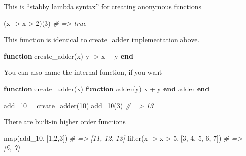 \documentclass[ignorenonframetext,]{beamer}
\newenvironment{Shaded}{}{}
\newcommand{\KeywordTok}[1]{\textcolor[rgb]{0.00,0.44,0.13}{\textbf{{#1}}}}
\newcommand{\FloatTok}[1]{\textcolor[rgb]{0.25,0.63,0.44}{{#1}}}
\newcommand{\CommentTok}[1]{\textcolor[rgb]{0.38,0.63,0.69}{\textit{{#1}}}}
\newcommand{\NormalTok}[1]{{#1}}
\begin{document}
\begin{frame}[fragile]{This is ``stabby lambda syntax'' for creating
anonymous functions}

\begin{Shaded}
\begin{Highlighting}[]
\NormalTok{(x -> x > }\FloatTok{2}\NormalTok{)(}\FloatTok{3}\NormalTok{) }\CommentTok{# => true}
\end{Highlighting}
\end{Shaded}

\end{frame}

\begin{frame}[fragile]{This function is identical to create\_adder
implementation above.}

\begin{Shaded}
\begin{Highlighting}[]
\KeywordTok{function} \NormalTok{create_adder(x)}
    \NormalTok{y -> x + y}
\KeywordTok{end}
\end{Highlighting}
\end{Shaded}

\end{frame}

\begin{frame}[fragile]{You can also name the internal function, if you
want}

\begin{Shaded}
\begin{Highlighting}[]
\KeywordTok{function} \NormalTok{create_adder(x)}
    \KeywordTok{function} \NormalTok{adder(y)}
        \NormalTok{x + y}
    \KeywordTok{end}
    \NormalTok{adder}
\KeywordTok{end}

\NormalTok{add_10 = create_adder(}\FloatTok{10}\NormalTok{)}
\NormalTok{add_10(}\FloatTok{3}\NormalTok{) }\CommentTok{# => 13}
\end{Highlighting}
\end{Shaded}

\end{frame}

\begin{frame}[fragile]{There are built-in higher order functions}

\begin{Shaded}
\begin{Highlighting}[]
\NormalTok{map(add_10, [}\FloatTok{1}\NormalTok{,}\FloatTok{2}\NormalTok{,}\FloatTok{3}\NormalTok{]) }\CommentTok{# => [11, 12, 13]}
\NormalTok{filter(x -> x > }\FloatTok{5}\NormalTok{, [}\FloatTok{3}\NormalTok{, }\FloatTok{4}\NormalTok{, }\FloatTok{5}\NormalTok{, }\FloatTok{6}\NormalTok{, }\FloatTok{7}\NormalTok{]) }\CommentTok{# => [6, 7]}
\end{Highlighting}
\end{Shaded}

\end{frame}
\end{document}
